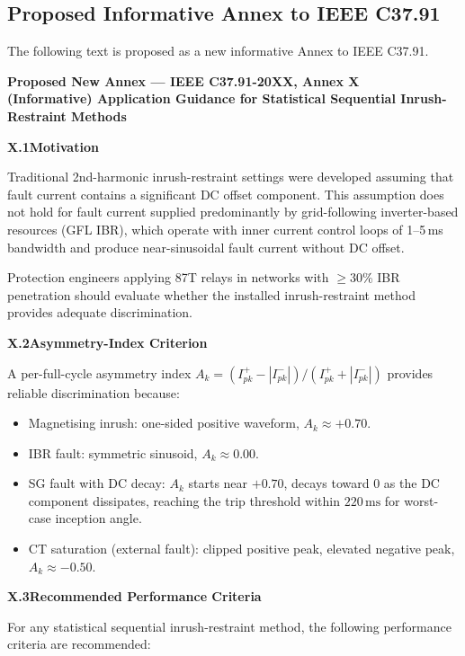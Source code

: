 \documentclass[11pt, a4paper]{article}
\newcommand{\ms}{\,\text{ms}}
\begin{document}
\subsection{Proposed Informative Annex to IEEE C37.91}

The following text is proposed as a new informative Annex to IEEE C37.91.

\begin{propbox}
  \textbf{Proposed New Annex --- IEEE C37.91-20XX, Annex X}\\
  \textbf{(Informative) Application Guidance for Statistical Sequential
  Inrush-Restraint Methods}

  \medskip
  \textbf{X.1\quad Motivation}

  Traditional 2nd-harmonic inrush-restraint settings were developed assuming
  that fault current contains a significant DC offset component.  This
  assumption does not hold for fault current supplied predominantly by
  grid-following inverter-based resources (GFL IBR), which operate with
  inner current control loops of 1--5\,ms bandwidth and produce
  near-sinusoidal fault current without DC offset.

  Protection engineers applying 87T relays in networks with $\geq$30\% IBR
  penetration should evaluate whether the installed inrush-restraint method
  provides adequate discrimination.

  \medskip
  \textbf{X.2\quad Asymmetry-Index Criterion}

  A per-full-cycle asymmetry index $A_k = (I^+_{pk} - |I^-_{pk}|) /
  (I^+_{pk} + |I^-_{pk}|)$ provides reliable discrimination because:

  \begin{itemize}
    \item Magnetising inrush: one-sided positive waveform, $A_k \approx +0.70$.
    \item IBR fault: symmetric sinusoid, $A_k \approx 0.00$.
    \item SG fault with DC decay: $A_k$ starts near $+0.70$, decays toward
      $0$ as the DC component dissipates, reaching the trip threshold within
      $220\ms$ for worst-case inception angle.
    \item CT saturation (external fault): clipped positive peak, elevated
      negative peak, $A_k \approx -0.50$.
  \end{itemize}

  \medskip
  \textbf{X.3\quad Recommended Performance Criteria}

  For any statistical sequential inrush-restraint method, the following
  performance criteria are recommended:


\end{propbox}
\end{document}
